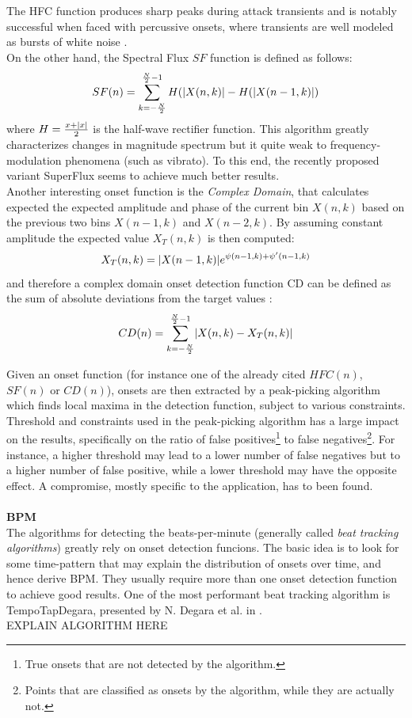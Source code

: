 The HFC function produces sharp peaks during attack transients and is notably successful when faced with percussive onsets, where transients are well modeled as bursts of white noise \cite{bello05}.\\
On the other hand, the Spectral Flux $SF$ function is defined as follows:
\begin{equation}
SF(n) = \sum\limits_{k=-\frac{N}{2}}^{\frac{N}{2}-1} H(\lvert X(n, k)\rvert - H(\lvert X(n - 1, k)\rvert)
\end{equation}
where $H = \frac{x + \lvert x\rvert}{2}$ is the half-wave rectifier function. This algorithm greatly characterizes changes in magnitude spectrum but it quite weak to frequency-modulation phenomena (such as vibrato). To this end, the recently proposed variant SuperFlux \cite{bock13} seems to achieve much better results. \\
Another interesting onset function is the \textit{Complex Domain}, that calculates expected the expected amplitude and phase of the current bin $X(n, k)$ based on the previous two bins $X(n - 1, k)$ and $X(n -2, k)$. By assuming constant amplitude the expected value $X_T(n, k)$ is then computed:
\begin{equation}
X_T(n, k) = \lvert X(n - 1, k)\rvert e^{\psi (n - 1, k) + \psi ' (n - 1, k)} 
\end{equation}
and therefore a complex domain onset detection function CD can be defined as the sum of absolute deviations from the target values \cite{dixon06}:
\begin{equation}
CD(n) = \sum\limits_{k=-\frac{N}{2}}^{\frac{N}{2}-1} \lvert X(n, k)-X_T(n,k)\rvert
\end{equation}

Given an onset function (for instance one of the already cited $HFC(n)$, $SF(n)$ or $CD(n)$), onsets are then extracted by a peak-picking algorithm which finds local maxima in the detection function, subject to various constraints. Threshold and constraints used in the peak-picking algorithm has a large impact on the results, specifically on the ratio of false positives\footnote{True onsets that are not detected by the algorithm.} to false negatives\footnote{Points that are classified as onsets by the algorithm, while they are actually not.}. For instance, a higher threshold may lead to a lower number of false negatives but to a higher number of false positive, while a lower threshold may have the opposite effect. A compromise, mostly specific to the application, has to been found.
\\ \\ 
\textbf{BPM} \\ 
The algorithms for detecting the beats-per-minute (generally called \textit{beat tracking algorithms}) greatly rely on onset detection funcions. The basic idea is to look for some time-pattern that may explain the distribution of onsets over time, and hence derive BPM. They usually require more than one onset detection function to achieve good results. One of the most performant beat tracking algorithm is TempoTapDegara, presented by N. Degara et al. in \cite{degara12}. \\ EXPLAIN ALGORITHM HERE

